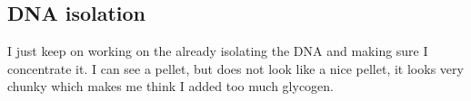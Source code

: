 \subsection{DNA isolation}
\label{task:20180105_cj0}

I just keep on working on the already isolating the DNA and making sure I concentrate it. I can see a pellet, but does not look like a nice pellet, it looks very chunky which makes me think I added too much glycogen.